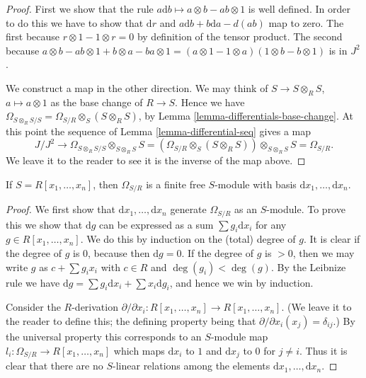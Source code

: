 \begin{proof}
First we show that the rule $a \text{d} b \mapsto a\otimes b - ab\otimes 1$
is well defined. In order to do this we have to show
that $\text{d}r$ and $a\text{d}b + b \text{d}a - d(ab)$ map to zero.
The first because $r\otimes 1 - 1 \otimes r = 0$ by definition
of the tensor product. The second because
$a\otimes b - ab\otimes 1 + b\otimes a - ba\otimes 1
=
(a\otimes 1 - 1\otimes a)(1\otimes b - b\otimes 1)
$
is in $J^2$.

\medskip\noindent
We construct a map in the other direction.
We may think of $S \to S\otimes_R S$, $a \mapsto a\otimes 1$
as the base change of $R \to S$. Hence we have
$\Omega_{S\otimes_R S/S} = \Omega_{S/R} \otimes_S (S\otimes_R S)$,
by Lemma \ref{lemma-differentials-base-change}.
At this point the sequence of Lemma \ref{lemma-differential-seq} gives a map
$$
J/J^2  \to \Omega_{S\otimes_RS/ S} \otimes_{S\otimes_R S} S
= (\Omega_{S/R} \otimes_S (S\otimes_R S))\otimes_{S\otimes_R S} S
= \Omega_{S/R}.
$$
We leave it to the reader to see it is the inverse of the map
above.
\end{proof}




\begin{lemma}
\label{lemma-differentials-polynomial-ring}
If $S = R[x_1, \ldots, x_n]$, then
$\Omega_{S/R}$ is a finite free $S$-module with
basis $\text{d}x_1, \ldots, \text{d}x_n$.
\end{lemma}

\begin{proof}
We first show that $\text{d}x_1, \ldots, \text{d}x_n$
generate $\Omega_{S/R}$ as an $S$-module. To prove this
we show that $\text{d}g$ can be expressed as a
sum $\sum g_i \text{d}x_i$ for any $g \in R[x_1, \ldots, x_n]$.
We do this by induction on the (total) degree of $g$.
It is clear if the degree of $g$ is $0$, because then
$\text{d}g = 0$. If the degree of $g$ is $>0$, then
we may write $g$ as $c + \sum g_i x_i$ with $c\in R$
and $\deg(g_i) < \deg(g)$. By the Leibnize rule we have
$\text{d}g = \sum g_i \text{d} x_i + \sum x_i \text{d}g_i$,
and hence we win by induction.

\medskip\noindent
Consider the $R$-derivation $\partial / \partial x_i :
R[x_1, \ldots, x_n] \to R[x_1, \ldots, x_n]$. (We leave it to
the reader to define this; the defining property
being that $\partial / \partial x_i (x_j) = \delta_{ij}$.)
By the universal property this corresponds to an $S$-module map $l_i :
\Omega_{S/R} \to R[x_1, \ldots, x_n]$ which maps $\text{d}x_i$
to $1$ and $\text{d}x_j$ to $0$ for $j \not= i$.
Thus it is clear that there are no $S$-linear relations
among the elements $\text{d}x_1, \ldots, \text{d}x_n$.
\end{proof}

